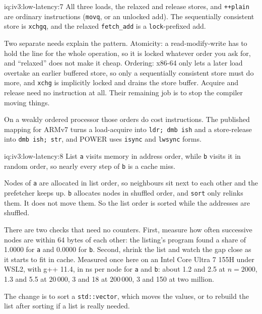 \begin{solution}{iq:iv3:low-latency:7}
All three loads, the relaxed and release stores, and \texttt{++plain} are ordinary instructions (\texttt{movq}, or an unlocked add). The sequentially consistent store is \texttt{xchgq}, and the relaxed \texttt{fetch\_add} is a \texttt{lock}-prefixed add.

Two separate needs explain the pattern. Atomicity: a read-modify-write has to hold the line for the whole operation, so it is locked whatever order you ask for, and ``relaxed'' does not make it cheap. Ordering: x86-64 only lets a later load overtake an earlier buffered store, so only a sequentially consistent store must do more, and \texttt{xchg} is implicitly locked and drains the store buffer. Acquire and release need no instruction at all. Their remaining job is to stop the compiler moving things.

On a weakly ordered processor those orders do cost instructions. The published mapping for ARMv7 turns a load-acquire into \texttt{ldr; dmb ish} and a store-release into \texttt{dmb ish; str}, and POWER uses \texttt{isync} and \texttt{lwsync} forms.

\end{solution}

\begin{solution}{iq:iv3:low-latency:8}
List \texttt{a} visits memory in address order, while \texttt{b} visits it in random order, so nearly every step of \texttt{b} is a cache miss.

Nodes of \texttt{a} are allocated in list order, so neighbours sit next to each other and the prefetcher keeps up. \texttt{b} allocates nodes in shuffled order, and \texttt{sort} only relinks them. It does not move them. So the list order is sorted while the addresses are shuffled.

There are two checks that need no counters. First, measure how often successive nodes are within 64 bytes of each other: the listing's program found a share of 1.0000 for \texttt{a} and 0.0000 for \texttt{b}. Second, shrink the list and watch the gap close as it starts to fit in cache. Measured once here on an Intel Core Ultra 7 155H under WSL2, with g++ 11.4, in ns per node for \texttt{a} and \texttt{b}: about 1.2 and 2.5 at $n = 2000$, 1.3 and 5.5 at $20\,000$, 3 and 18 at $200\,000$, 3 and 150 at two million.

The change is to sort a \texttt{std::vector}, which moves the values, or to rebuild the list after sorting if a list is really needed.

\end{solution}

